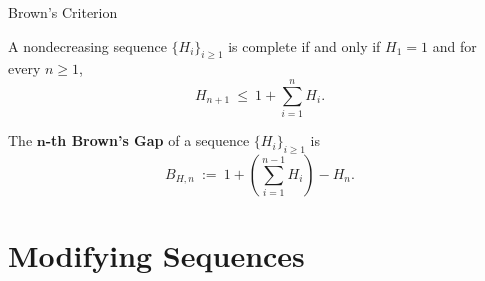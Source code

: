 \documentclass[handout]{beamer}
\begin{document}
\begin{frame}{
    Brown's Criterion}
    \begin{theorem}[Brown]
    A nondecreasing sequence $\{H_i\}_{i \ge 1}$ is complete if and only if $H_1 = 1$ and for every $n \ge 1$,\vspace{-0.1in}
        \[
            H_{n + 1} \ \leq \ 1 + \sum_{i = 1}^{n} H_i.
        \]
    \end{theorem}
    \pause
    \bigskip
    \begin{definition}
    The \textbf{$\boldsymbol{n}$-th Brown's Gap} of a sequence $\{H_i\}_{i \ge 1}$ is $$B_{H, n} \ := \ 1 + \left(\sum_{i=1}^{n-1}H_i\right) - H_n .$$
    \end{definition}
\end{frame}

\begin{comment}
\begin{frame}{Complete Sequences in Practice}
    \begin{definition}
    A \textbf{numeration system} is a set of integer basis elements where every integer can be represented uniquely over the set using bounded integer digits.
    \end{definition}
    \begin{itemize}
        \item Numeration systems facilitate problems in combinatorial group theory, ranking of permutations and combinations, strategies of games, and many others. 
        \item Previous work in numeration systems defined by recurrent sequences was purely combinatorial and heavily based on the words corresponding to greedy expressions for natural numbers. 
    \end{itemize}
\end{frame}
\end{comment}

\section{Modifying Sequences}
\end{document}
